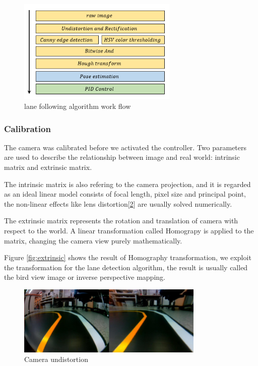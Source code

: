 \documentclass[conference]{IEEEtran}
\begin{document}
\begin{figure}
	\centering
	\includegraphics[width=3in]{img/lane_flow.png}
	\caption{lane following algorithm work flow}
	\label{fig:lane_following_flow}
\end{figure}

\subsubsection{Calibration}

The camera was calibrated before we activated the controller. Two parameters are used to describe the relationship between image and real world: intrinsic matrix and extrinsic matrix.

The intrinsic matrix is also refering to the camera projection, and it is regarded as an ideal linear model consists of focal length, pixel size and principal point, the non-linear effects like lens distortion[\ref{fig:intrinsic}] are usually solved numerically.

The extrinsic matrix represents the rotation and translation of camera with respect to the world. A linear transformation called Homograpy is applied to the matrix, changing the camera view purely mathematically.

Figure \ref{fig:extrinsic} shows the result of Homography transformation, we exploit the transformation for the lane detection algorithm, the result is usually called the bird view image or inverse perspective mapping.

\begin{figure}
	\centering
	\includegraphics[width=3.5in]{img/intrinsic.png}
	\caption{Camera undistortion}
	\label{fig:intrinsic}
\end{figure}
\end{document}
